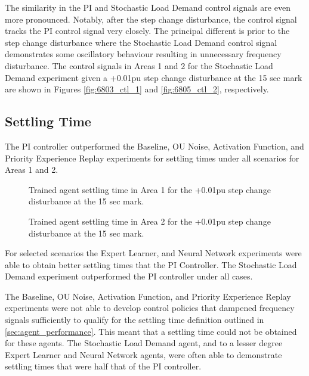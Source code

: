 The similarity in the PI and Stochastic Load Demand control signals are even more pronounced. Notably, after the step change disturbance, the control signal tracks the PI control signal very closely. The principal different is prior to the step change disturbance where the Stochastic Load Demand control signal demonstrates some oscillatory behaviour resulting in unnecessary frequency disturbance. The control signals in Areas 1 and 2 for the Stochastic Load Demand experiment given a +0.01pu step change disturbance at the 15 sec mark are shown in Figures \ref{fig:6803_ctl_1} and \ref{fig:6805_ctl_2}, respectively.


\subsection{Settling Time}
The PI controller outperformed the Baseline, OU Noise, Activation Function, and Priority Experience Replay experiments for settling times under all scenarios for Areas 1 and 2.

\begin{figure}[h]
	\begin{minipage}[t]{0.50\textwidth}
		\centering
		\resizebox{7cm}{!}{}
		\caption[Area 1 settling time comparison]{Trained agent settling time in Area 1 for the +0.01pu step change disturbance at the 15 sec mark.}\label{fig:7207_settling_time_area_1}
	\end{minipage}
	\hspace{0.25cm}
	\begin{minipage}[t]{0.50\textwidth}
		\resizebox{7cm}{!}{}
		\caption[Area 2 settling time comparison]{Trained agent settling time in Area 2 for the +0.01pu step change disturbance at the 15 sec mark.}\label{fig:7208_settling_time_area_2}
	\end{minipage}
\end{figure}

For selected scenarios the Expert Learner, and Neural Network experiments were able to obtain better settling times that the PI Controller. The Stochastic Load Demand experiment outperformed the PI controller under all cases.

The Baseline, OU Noise, Activation Function, and Priority Experience Replay experiments were not able to develop control policies that dampened frequency signals sufficiently to qualify for the settling time definition outlined in \textsection \ref{sec:agent_performance}. This meant that a settling time could not be obtained for these agents. The Stochastic Load Demand agent, and to a lesser degree Expert Learner and Neural Network agents, were often able to demonstrate settling times that were half that of the PI controller.

